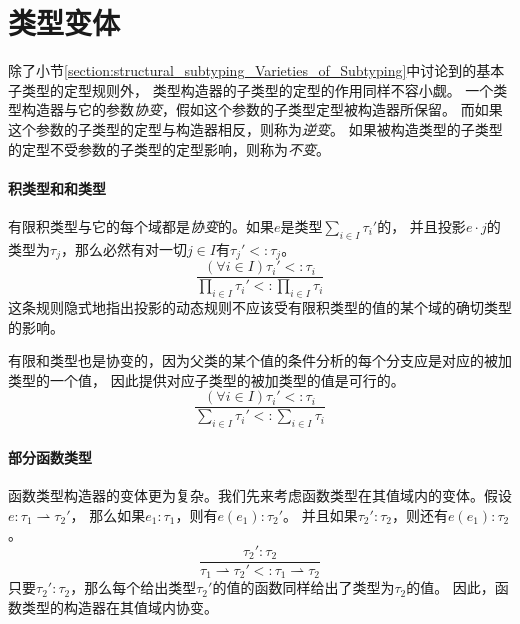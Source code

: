 \section{类型变体}\label{section:structural_subtyping_Variance}
除了小节\ref{section:structural_subtyping_Varieties_of_Subtyping}中讨论到的基本子类型的定型规则外，
类型构造器的子类型的定型的作用同样不容小觑。
一个类型构造器与它的参数\textit{协变}，假如这个参数的子类型定型被构造器所保留。
而如果这个参数的子类型的定型与构造器相反，则称为\textit{逆变}。
如果被构造类型的子类型的定型不受参数的子类型的定型影响，则称为\textit{不变}。

\paragraph{积类型和和类型}
有限积类型与它的每个域都是\textit{协变}的。如果$e$是类型$\sum_{i\in I}\tau_i {'}$的，
并且投影$e\cdot j$的类型为$\tau_j$，那么必然有对一切$j \in I$有$\tau_j{'}<:\tau_j$。
\begin{equation}
    \frac{(\forall i \in I)\tau_i{'}<:\tau_i}{\prod_{i\in I}\tau_i{'}<:\prod_{i \in I}\tau_i}
\end{equation}
这条规则隐式地指出投影的动态规则不应该受有限积类型的值的某个域的确切类型的影响。

有限和类型也是协变的，因为父类的某个值的条件分析的每个分支应是对应的被加类型的一个值，
因此提供对应子类型的被加类型的值是可行的。
\begin{equation}
    \frac{(\forall i \in I)\tau_i{'}<:\tau_i}{\sum_{i\in I}\tau_i{'}<:\sum_{i \in I}\tau_i}
\end{equation}

\paragraph{部分函数类型}
函数类型构造器的变体更为复杂。我们先来考虑函数类型在其值域内的变体。假设$e:\tau_1 \rightharpoonup \tau_2{'}$，
那么如果$e_1:\tau_1$，则有$e(e_1):\tau_2{'}$。
并且如果$\tau_2{'}:\tau_2$，则还有$e(e_1):\tau_2$。
\begin{equation}
    \frac{\tau_2{'}:\tau_2}{\tau_1 \rightharpoonup \tau_2{'}<:\tau_1 \rightharpoonup \tau_2}
\end{equation}
只要$\tau_2{'}:\tau_2$，那么每个给出类型$\tau_2{'}$的值的函数同样给出了类型为$\tau_2$的值。
因此，函数类型的构造器在其值域内协变。

